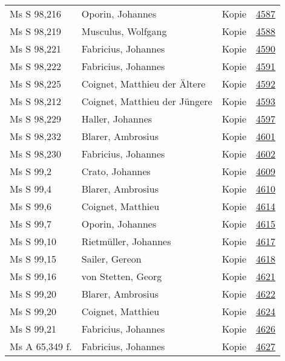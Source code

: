 \documentclass[10pt,a4paper,landscape]{report}
\begin{document}
\begin{longtable}{p{16cm}p{4cm}lr}
Ms S 98,216	&	Oporin, Johannes	&	Kopie	&	\href{http://130.60.24.72/assignment/4587}{4587}\\
Ms S 98,219	&	Musculus, Wolfgang	&	Kopie	&	\href{http://130.60.24.72/assignment/4588}{4588}\\
Ms S 98,221	&	Fabricius, Johannes	&	Kopie	&	\href{http://130.60.24.72/assignment/4590}{4590}\\
Ms S 98,222	&	Fabricius, Johannes	&	Kopie	&	\href{http://130.60.24.72/assignment/4591}{4591}\\
Ms S 98,225	&	Coignet, Matthieu der Ältere	&	Kopie	&	\href{http://130.60.24.72/assignment/4592}{4592}\\
Ms S 98,212	&	Coignet, Matthieu der Jüngere	&	Kopie	&	\href{http://130.60.24.72/assignment/4593}{4593}\\
Ms S 98,229	&	Haller, Johannes	&	Kopie	&	\href{http://130.60.24.72/assignment/4597}{4597}\\
Ms S 98,232	&	Blarer, Ambrosius	&	Kopie	&	\href{http://130.60.24.72/assignment/4601}{4601}\\
Ms S 98,230	&	Fabricius, Johannes	&	Kopie	&	\href{http://130.60.24.72/assignment/4602}{4602}\\
Ms S 99,2	&	Crato, Johannes	&	Kopie	&	\href{http://130.60.24.72/assignment/4609}{4609}\\
Ms S 99,4	&	Blarer, Ambrosius	&	Kopie	&	\href{http://130.60.24.72/assignment/4610}{4610}\\
Ms S 99,6	&	Coignet, Matthieu	&	Kopie	&	\href{http://130.60.24.72/assignment/4614}{4614}\\
Ms S 99,7	&	Oporin, Johannes	&	Kopie	&	\href{http://130.60.24.72/assignment/4615}{4615}\\
Ms S 99,10	&	Rietmüller, Johannes	&	Kopie	&	\href{http://130.60.24.72/assignment/4617}{4617}\\
Ms S 99,15	&	Sailer, Gereon	&	Kopie	&	\href{http://130.60.24.72/assignment/4618}{4618}\\
Ms S 99,16	&	von Stetten, Georg	&	Kopie	&	\href{http://130.60.24.72/assignment/4621}{4621}\\
Ms S 99,20	&	Blarer, Ambrosius	&	Kopie	&	\href{http://130.60.24.72/assignment/4622}{4622}\\
Ms S 99,20	&	Coignet, Matthieu	&	Kopie	&	\href{http://130.60.24.72/assignment/4624}{4624}\\
Ms S 99,21	&	Fabricius, Johannes	&	Kopie	&	\href{http://130.60.24.72/assignment/4626}{4626}\\
Ms A 65,349 f.	&	Fabricius, Johannes	&	Kopie	&	\href{http://130.60.24.72/assignment/4627}{4627}\\

\end{longtable}
\end{document}
